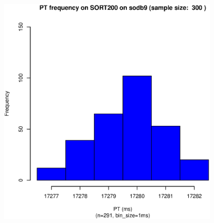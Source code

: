 \documentclass[10pt]{article}
\begin{document}
\begin{figure}[htp!]
{		\includegraphics[scale=0.43]{s9_sort200_dist.eps}
		\label{fig:s9_sort200_dist}
	}
\end{figure}
\end{document}
